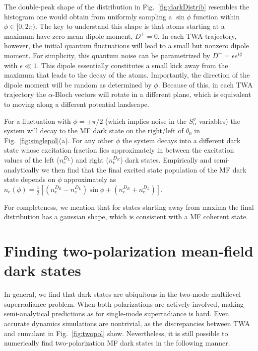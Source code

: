 \documentclass[aps,prx,superscriptaddress,twocolumn,notitlepage,nofootinbib,longbibliography]{revtex4-2}
\begin{document}
The double-peak shape of the distribution in Fig.~\ref{fig:darkDistrib} resembles the histogram one would obtain from uniformly sampling a $\sin\phi$ function within $\phi\in[0,2\pi)$.
The key to understand this shape is that atoms starting at a maximum have zero mean dipole moment, $D^+=0$. In each TWA trajectory, however, the initial quantum fluctuations will lead to a small but nonzero dipole moment.
For simplicity, this quantum noise can be parametrized by $D^+=\epsilon e^{i\phi}$ with $\epsilon\ll1$.
This dipole essentially constitutes a small kick away from the maximum that leads to the decay of the atoms. Importantly, the direction of the dipole moment will be random as determined by $\phi$. Because of this, in each TWA trajectory the $\alpha$-Bloch vectors will rotate in a different plane, which is equivalent to moving along a different potential landscape.

For a fluctuation with $\phi=\pm\pi/2$ (which implies noise in the $S^y_\alpha$ variables) the system will decay to the MF dark state on the right/left of $\theta_0$ in Fig.~\ref{fig:singlepol}(a). For any other $\phi$ the system decays into a different dark state whose excitation fraction lies approximately in between the excitation values of the left ($n_e^{D_L}$) and right ($n_e^{D_R}$) dark states. Empirically and semi-analytically we then find that the final excited state population of the MF dark state depends on $\phi$ approximately as $n_e(\phi)=\frac{1}{2}[(n_e^{D_R}-n_e^{D_L})\sin\phi + (n_e^{D_R}+n_e^{D_L})]$.

For completeness, we mention that for states starting away from maxima the final distribution has a gaussian shape, which is consistent with a MF coherent state.







\section{Finding two-polarization mean-field dark states\label{app:finding_twopol_darks}}

In general, we find that dark states are ubiquitous in the two-mode multilevel superradiance problem.
When both polarizations are actively involved, making semi-analytical predictions as for single-mode superradiance is hard.
Even accurate dynamics simulations are nontrivial, as the discrepancies between TWA and cumulant in Fig.~\ref{fig:twopol} show.
Nevertheless, it is still possible to numerically find two-polarization MF dark states in the following manner.
\end{document}
